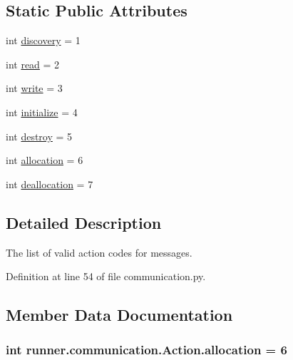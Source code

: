 \subsection*{Static Public Attributes}
\begin{DoxyCompactItemize}
\item 
int \hyperlink{classrunner_1_1communication_1_1Action_a14f5037ec1180956c92722021f57b3be}{discovery} = 1
\item 
int \hyperlink{classrunner_1_1communication_1_1Action_a15efb8eb81879035e1b81cdc52f38ac8}{read} = 2
\item 
int \hyperlink{classrunner_1_1communication_1_1Action_a78dfe8e8920c83252227f854cfd895e1}{write} = 3
\item 
int \hyperlink{classrunner_1_1communication_1_1Action_aea3aee926d631e7db6d4bbb866abbed9}{initialize} = 4
\item 
int \hyperlink{classrunner_1_1communication_1_1Action_ae28864e7f871e01df3998a8029029540}{destroy} = 5
\item 
int \hyperlink{classrunner_1_1communication_1_1Action_af90b53ca581f3eed8bfec818aea67713}{allocation} = 6
\item 
int \hyperlink{classrunner_1_1communication_1_1Action_a1bfe79592d0366af56e56c471a424934}{deallocation} = 7
\end{DoxyCompactItemize}


\subsection{Detailed Description}
\begin{DoxyVerb}The list of valid action codes for messages.
\end{DoxyVerb}
 

Definition at line 54 of file communication.\+py.



\subsection{Member Data Documentation}
\hypertarget{classrunner_1_1communication_1_1Action_af90b53ca581f3eed8bfec818aea67713}{}
\subsubsection[{allocation}]{\setlength{\rightskip}{0pt plus 5cm}int runner.\+communication.\+Action.\+allocation = 6\hspace{0.3cm}{\ttfamily [static]}}\label{classrunner_1_1communication_1_1Action_af90b53ca581f3eed8bfec818aea67713}


